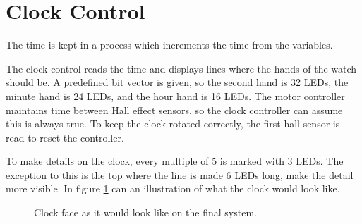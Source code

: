 \section{Clock Control}
The time is kept in a process which increments the time from the variables.

The clock control reads the time and displays lines where the hands of the watch should be.
A predefined bit vector is given, so the second hand is 32 LEDs, the minute hand is 24 LEDs, and the hour hand is 16 LEDs.
The motor controller maintains time between Hall effect sensors, so the clock controller can assume this is always true.
To keep the clock rotated correctly, the first hall sensor is read to reset the controller.

To make details on the clock, every multiple of 5 is marked with 3 LEDs.
The exception to this is the top where the line is made 6 LEDs long, make the detail more visible.
In figure \ref{fig:clock_face} can an illustration of what the clock would look like.

\begin{figure}[h]
\centering
{}
 \caption{Clock face as it would look like on the final system.}
 \label{fig:clock_face}
\end{figure}